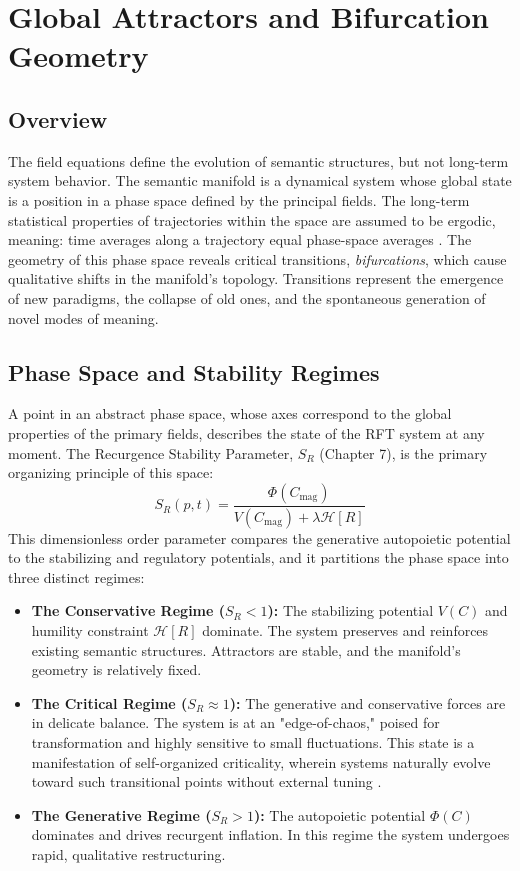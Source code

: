 \chapter{Global Attractors and Bifurcation Geometry}

\section{Overview}

The field equations define the evolution of semantic structures, but not long-term system behavior. The semantic manifold is a dynamical system whose global state is a position in a phase space defined by the principal fields. The long-term statistical properties of trajectories within the space are assumed to be ergodic, meaning: time averages along a trajectory equal phase-space averages \autocite{Birkhoff1931}. The geometry of this phase space reveals critical transitions, \textit{bifurcations}, which cause qualitative shifts in the manifold's topology. Transitions represent the emergence of new paradigms, the collapse of old ones, and the spontaneous generation of novel modes of meaning.

\section{Phase Space and Stability Regimes}

A point in an abstract phase space, whose axes correspond to the global properties of the primary fields, describes the state of the RFT system at any moment. The Recurgence Stability Parameter, \(S_R\) (Chapter 7), is the primary organizing principle of this space:
\begin{equation}
S_R(p,t) = \frac{\Phi(C_{\mathrm{mag}})}{V(C_{\mathrm{mag}}) + \lambda \mathcal{H}[R]}
\end{equation}
This dimensionless order parameter compares the generative autopoietic potential to the stabilizing and regulatory potentials, and it partitions the phase space into three distinct regimes:
\begin{itemize}
    \item \textbf{The Conservative Regime (\(S_R < 1\)):} The stabilizing potential \(V(C)\) and humility constraint \(\mathcal{H}[R]\) dominate. The system preserves and reinforces existing semantic structures. Attractors are stable, and the manifold's geometry is relatively fixed.
    \item \textbf{The Critical Regime (\(S_R \approx 1\)):} The generative and conservative forces are in delicate balance. The system is at an "edge-of-chaos," poised for transformation and highly sensitive to small fluctuations. This state is a manifestation of self-organized criticality, wherein systems naturally evolve toward such transitional points without external tuning \autocite{BakTangWiesenfeld1987, Kauffman1993}.
    \item \textbf{The Generative Regime (\(S_R > 1\)):} The autopoietic potential \(\Phi(C)\) dominates and drives recurgent inflation. In this regime the system undergoes rapid, qualitative restructuring.
\end{itemize}

